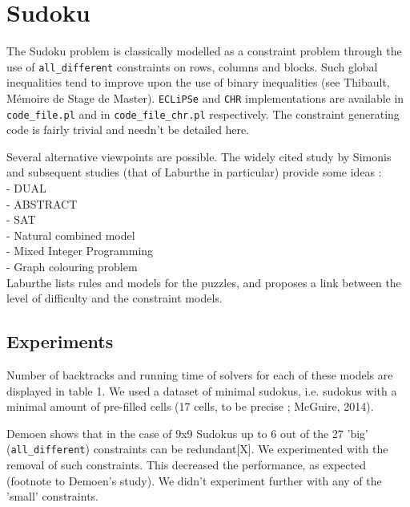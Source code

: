 \section{Sudoku}

The Sudoku problem is classically modelled as a constraint problem through the use of \texttt{all\_different} constraints on rows, columns and blocks. Such global inequalities tend to improve upon the use of binary inequalities (see Thibault, M\'emoire de Stage de Master). \texttt{ECLiPSe} and \texttt{CHR} implementations are available in \texttt{code\_file.pl} and in \texttt{code\_file\_chr.pl} respectively. The constraint generating code is fairly trivial and needn't be detailed here. \\\par

Several alternative viewpoints are possible. The widely cited study by Simonis and subsequent studies (that of Laburthe in particular) provide some ideas :\\
 - DUAL\\
 - ABSTRACT\\
 - SAT\\
 - Natural combined model\\
 - Mixed Integer Programming\\
 - Graph colouring problem\\
Laburthe lists rules and models for the puzzles, and proposes a link between the level of difficulty and the constraint models. \\\par

\subsection{Experiments}

Number of backtracks and running time of solvers for each of these models are displayed in table 1. We used a dataset of minimal sudokus, i.e. sudokus with a minimal amount of pre-filled cells (17 cells, to be precise ; McGuire, 2014). \\\par

Demoen shows that in the case of 9x9 Sudokus up to 6 out of the 27 'big' (\texttt{all\_different}) constraints can be redundant[X]. We experimented with the removal of such constraints. This decreased the performance, as expected (footnote to Demoen's study). We didn't experiment further with any of the 'small' constraints.

